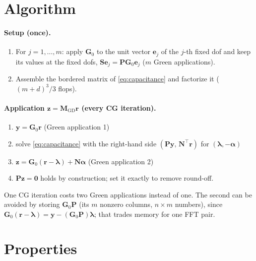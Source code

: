 \documentclass[11pt,a4paper]{article}
\begin{document}
\section*{Algorithm}

\paragraph{Setup (once).}
\begin{enumerate}
  \item For $j = 1,\dots,m$: apply $\mathbf{G}_0$ to the unit vector $\mathbf{e}_j$ of the $j$-th fixed dof and keep
        its values at the fixed dofs, $\mathbf{S}\mathbf{e}_j = \mathbf{P}\mathbf{G}_0\mathbf{e}_j$ ($m$ Green applications).
  \item Assemble the bordered matrix of \eqref{eq:capacitance} and factorize it ($(m+d)^3/3$ flops).
\end{enumerate}

\paragraph{Application $\mathbf{z} = \mathbf{M}_{\mathrm{GD}}\mathbf{r}$ (every CG iteration).}
\begin{enumerate}
  \item $\mathbf{y} = \mathbf{G}_0\mathbf{r}$ \hfill (Green application 1)
  \item solve \eqref{eq:capacitance} with the right-hand side $(\mathbf{P}\mathbf{y},\, \mathbf{N}^{\top}\mathbf{r})$
        for $(\boldsymbol{\lambda}, -\boldsymbol{\alpha})$
  \item $\mathbf{z} = \mathbf{G}_0(\mathbf{r} - \boldsymbol{\lambda}) + \mathbf{N}\boldsymbol{\alpha}$
        \hfill (Green application 2)
  \item $\mathbf{P}\mathbf{z} = \mathbf{0}$ holds by construction; set it exactly to remove round-off.
\end{enumerate}
One CG iteration costs two Green applications instead of one. The second can be avoided by storing
$\mathbf{G}_0\mathbf{P}$ (its $m$ nonzero columns, $n\times m$ numbers), since $\mathbf{G}_0(\mathbf{r} -
\boldsymbol{\lambda}) = \mathbf{y} - (\mathbf{G}_0\mathbf{P})\boldsymbol{\lambda}$; that trades memory for one FFT pair.

\section*{Properties}
\end{document}
